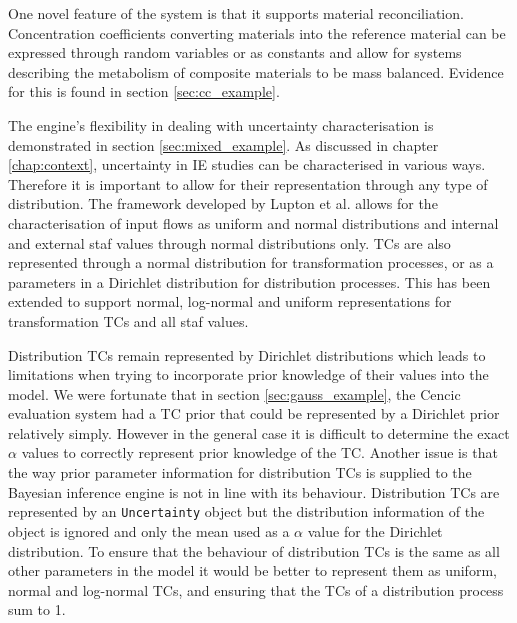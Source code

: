 \documentclass[ %
                    author={Tom Jager},
                supervisor={Dr. Daniel Schien},
                    degree={MEng},
                     title={A Bayesian Inference Engine for Calibrating Uncertainty over UMIS Structured MFA Systems},
                  subtitle={},
                      type={research},
                      year={2019} ]{dissertation}
\begin{document}
One novel feature of the system is that it supports material reconciliation. Concentration coefficients converting materials into the reference material can be expressed through random variables or as constants and allow for systems describing the metabolism of composite materials to be mass balanced. Evidence for this is found in section \ref{sec:cc_example}.

The engine's flexibility in dealing with uncertainty characterisation is demonstrated in section \ref{sec:mixed_example}. As discussed in chapter \ref{chap:context}, uncertainty in IE studies can be characterised in various ways. Therefore it is important to allow for their representation through any type of distribution. The framework developed by Lupton et al. allows for the characterisation of input flows as uniform and normal distributions and internal and external staf values through normal distributions only. TCs are also represented through a normal distribution for transformation processes, or as a parameters in a Dirichlet distribution for distribution processes. This has been extended to support normal, log-normal and uniform representations for transformation TCs and all staf values.

Distribution TCs remain represented by Dirichlet distributions which leads to limitations when trying to incorporate prior knowledge of their values into the model. We were fortunate that in section \ref{sec:gauss_example}, the Cencic evaluation system had a TC prior that could be represented by a Dirichlet prior relatively simply. However in the general case it is difficult to determine the exact $\alpha$ values to correctly represent prior knowledge of the TC. Another issue is that the way prior parameter information for distribution TCs is supplied to the Bayesian inference engine is not in line with its behaviour. Distribution TCs are represented by an \texttt{Uncertainty} object but the distribution information of the object is ignored and only the mean used as a $\alpha$ value for the Dirichlet distribution. To ensure that the behaviour of distribution TCs is the same as all other parameters in the model it would be better to represent them as uniform, normal and log-normal TCs, and ensuring that the TCs of a distribution process sum to 1.
\end{document}
